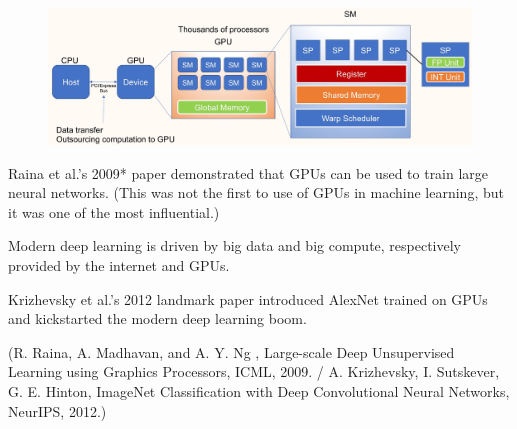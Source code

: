 \documentclass{report}
\begin{document}
\begin{concept}
    \begin{figure}[H]
        \centering
        \includegraphics[width=1.0\textwidth]{.././assets/4.7.jpg}
    \end{figure}
\end{concept}

\begin{concept}
    Raina et al.'s 2009* paper demonstrated that GPUs can be used to train large neural networks. (This was not the first to use of GPUs in machine learning, but it was one of the most influential.)

    Modern deep learning is driven by big data and big compute, respectively provided by the internet and GPUs.

    Krizhevsky et al.'s 2012 landmark paper introduced AlexNet trained on GPUs and kickstarted the modern deep learning boom.

    (R. Raina, A. Madhavan, and A. Y. Ng , Large-scale Deep Unsupervised Learning using Graphics Processors, ICML, 2009. / 
    A. Krizhevsky, I. Sutskever, G. E. Hinton, ImageNet Classification with Deep Convolutional Neural Networks, NeurIPS, 2012.)
\end{concept}
\end{document}
